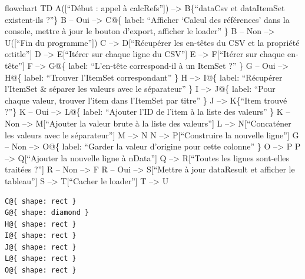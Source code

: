 \documentclass[
  letterpaper,
  DIV=11,
  numbers=noendperiod]{scrartcl}
\author{}
\date{}
\renewcommand*\contentsname{Table of contents}
\newcommand\contentsname{Table of contents}
\begin{document}
\renewcommand*\contentsname{Table of contents}
{
\hypersetup{linkcolor=}
\setcounter{tocdepth}{3}
\tableofcontents
}

flowchart TD A({[}``Début : appel à calcRefs''{]}) --\textgreater{}
B\{``dataCsv et dataItemSet existent-ils ?''\} B -- Oui --\textgreater{}
C@\{ label: ``Afficher `Calcul des références' dans la console, mettre à
jour le bouton d'export, afficher le loader'' \} B -- Non
--\textgreater{} U({[}``Fin du programme''{]}) C --\textgreater{}
D{[}``Récupérer les en-têtes du CSV et la propriété o:title''{]} D
--\textgreater{} E{[}``Itérer sur chaque ligne du CSV''{]} E
--\textgreater{} F{[}``Itérer sur chaque en-tête''{]} F --\textgreater{}
G@\{ label: ``L'en-tête correspond-il à un ItemSet ?'' \} G -- Oui
--\textgreater{} H@\{ label: ``Trouver l'ItemSet correspondant'' \} H
--\textgreater{} I@\{ label: ``Récupérer l'ItemSet \& séparer les
valeurs avec le séparateur'' \} I --\textgreater{} J@\{ label: ``Pour
chaque valeur, trouver l'item dans l'ItemSet par titre'' \} J
--\textgreater{} K\{``Item trouvé ?''\} K -- Oui --\textgreater{} L@\{
label: ``Ajouter l'ID de l'item à la liste des valeurs'' \} K -- Non
--\textgreater{} M{[}``Ajouter la valeur brute à la liste des
valeurs''{]} L --\textgreater{} N{[}``Concaténer les valeurs avec le
séparateur''{]} M --\textgreater{} N N --\textgreater{} P{[}``Construire
la nouvelle ligne''{]} G -- Non --\textgreater{} O@\{ label: ``Garder la
valeur d'origine pour cette colonne'' \} O --\textgreater{} P P
--\textgreater{} Q{[}``Ajouter la nouvelle ligne à nData''{]} Q
--\textgreater{} R{[}``Toutes les lignes sont-elles traitées ?''{]} R --
Non --\textgreater{} F R -- Oui --\textgreater{} S{[}``Mettre à jour
dataResult et afficher le tableau''{]} S --\textgreater{} T{[}``Cacher
le loader''{]} T --\textgreater{} U

\begin{verbatim}
C@{ shape: rect }
G@{ shape: diamond }
H@{ shape: rect }
I@{ shape: rect }
J@{ shape: rect }
L@{ shape: rect }
O@{ shape: rect }
\end{verbatim}
\end{document}
